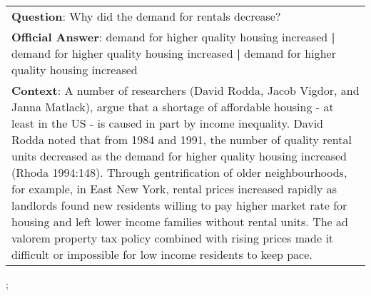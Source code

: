 \begin{figure*}[ht]
{\begin{tabular}{p{}}
            \textbf{Question}: Why did the demand for rentals decrease?                                                                                                                                                                                                                                                                                                                                                                                                                                                                                                                                                                                                                                                                                                \\
            \textbf{Official Answer}: demand for higher quality housing increased \textbf{|} demand for higher quality housing increased \textbf{|} demand for higher quality housing increased                                                                                                                                                                                                                                                                                                                                                                                                                                                                                                                                                                        \\
            \textbf{Context}: A number of researchers (David Rodda, Jacob Vigdor, and Janna Matlack), argue that a shortage of affordable housing - at least in the US - is caused in part by income inequality. David Rodda noted that from 1984 and 1991, the number of quality rental units decreased as the demand for higher quality housing increased (Rhoda 1994:148). Through gentrification of older neighbourhoods, for example, in East New York, rental prices increased rapidly as landlords found new residents willing to pay higher market rate for housing and left lower income families without rental units. The ad valorem property tax policy combined with rising prices made it difficult or impossible for low income residents to keep pace. \\
        \end{tabular}
    };
    \label{fig:ex-572a1c943f37b319004786e3}
\end{figure*}

